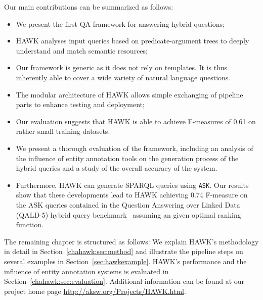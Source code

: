 
Our main contributions can be summarized as follows:
 \begin{itemize}
 \item We present the first \ac{QA} framework for answering hybrid questions;
 \item HAWK analyses input queries based on predicate-argument trees to deeply understand and match semantic resources;
 \item Our framework is generic as it does not rely on templates. It is thus inherently able to cover a wide variety of natural language questions. %
 \item The modular architecture of HAWK allows simple exchanging of pipeline parts to enhance testing and deployment;
 \item Our evaluation suggests that HAWK is able to achieve F-measures of 0.61 on rather small training datasets.
 \item We present a thorough evaluation of the framework, including an analysis of the influence of entity annotation tools on the generation process of the hybrid queries and a study of the overall accuracy of the system. 
 \item Furthermore, HAWK can generate SPARQL queries using \texttt{ASK}. Our results show that these developments lead to HAWK achieving 0.74 F-measure on the ASK queries contained in the Question Answering over Linked Data (\ac{QALD}-5) hybrid query benchmark~\cite{qald5} assuming an given optimal ranking function.
 \end{itemize}

The remaining chapter is structured as follows:
We explain HAWK's methodology in detail in Section~\ref{chahawk:sec:method} and illustrate the pipeline steps on several examples in Section~\ref{sec:hawkexample}.
HAWK's performance and the influence of entity annotation systems is evaluated in Section~\ref{chahawk:sec:evaluation}. 
Additional information can be found at our project home page \url{http://aksw.org/Projects/HAWK.html}.

